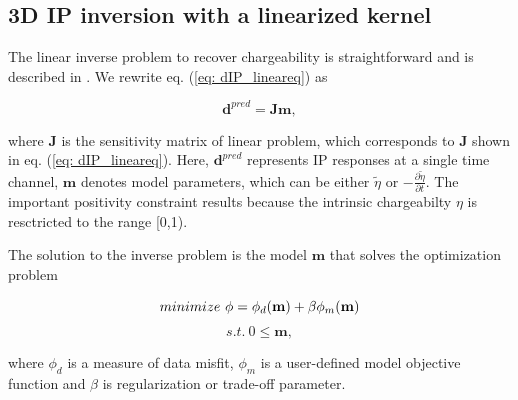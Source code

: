 \documentclass[extra,mreferee]{gji}
\newcommand{\peta}{\tilde{\eta}}
\begin{document}
\subsection{3D IP inversion with a linearized kernel}
The linear inverse problem to recover chargeability is straightforward and is described in \cite{doug1994}.
We rewrite eq. (\ref{eq: dIP_lineareq}) as
\begin{linenomath*}
\begin{equation}
  \mathbf{d}^{pred} = \mathbf{J}\mathbf{m},
  \label{eq9}
\end{equation}
\end{linenomath*}
where $\mathbf{J}$ is the  sensitivity matrix of linear problem, which corresponds to $\mathbf{J}$ shown in eq. (\ref{eq: dIP_lineareq}).
Here, $\mathbf{d}^{pred}$ represents IP responses at a single time channel, $\mathbf{m}$ denotes model parameters, which can be either $\peta$ or $-\frac{\partial \peta}{\partial t}$. The important positivity constraint results because the intrinsic chargeabilty $\eta$ is resctricted to the range [0,1).

The solution to the inverse problem is the model $\mathbf{m}$ that solves the optimization problem
\begin{linenomath*}
\begin{equation}
  minimize \ \phi =  \phi_d(\mathbf{m}) + \beta\phi_m(\mathbf{m}) \\
  \label{eq10}
\end{equation}
\begin{equation}
  s.t. \ 0 \le \mathbf{m}, \nonumber
\end{equation}

\end{linenomath*}
where $\phi_d$ is a measure of data misfit, $\phi_m$ is a user-defined model objective function and $\beta$ is regularization or trade-off parameter.
\end{document}
